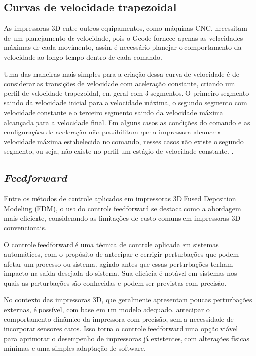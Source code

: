 \subsection{Curvas de velocidade trapezoidal}
As impressoras 3D entre outros equipamentos, como máquinas CNC, necessitam
de um planejamento de velocidade, pois o Gcode fornece apenas as velocidades máximas
de cada movimento, assim é necessário planejar o comportamento da velocidade ao longo tempo
dentro de cada comando.

Uma das maneiras mais simples para a criação dessa curva de velocidade é
de considerar as transições de velocidade com aceleração constante, criando 
um perfil de velocidade trapezoidal, em geral com 3 segmentos.
O primeiro segmento saindo da velocidade inicial para a velocidade máxima,
o segundo segmento com velocidade constante e o terceiro segmento saindo da velocidade máxima alcançada
para a velocidade final.
Em alguns casos as condições do comando e as configurações de aceleração não possibilitam que a impressora
alcance a velocidade máxima estabelecida no comando, nesses casos não existe o segundo segmento, ou seja, não existe
no perfil um estágio de velocidade constante.
\cite{yu20,klipperkinematic}.

\subsection{\textit{Feedforward}}
Entre os métodos de controle aplicados em impressoras 3D Fused Deposition Modeling (FDM), o uso do controle feedforward se destaca como a abordagem mais eficiente, considerando as limitações de custo comuns em impressoras 3D convencionais.

O controle feedforward é uma técnica de controle aplicada em sistemas automáticos, com o propósito de antecipar e corrigir perturbações que podem afetar um processo ou sistema, agindo antes que essas perturbações tenham impacto na saída desejada do sistema. Sua eficácia é notável em sistemas nos quais as perturbações são conhecidas e podem ser previstas com precisão.

No contexto das impressoras 3D, que geralmente apresentam poucas perturbações externas, é possível, com base em um modelo adequado, antecipar o comportamento dinâmico da impressora com precisão, sem a necessidade de incorporar sensores caros. Isso torna o controle feedforward uma opção viável para aprimorar o desempenho de impressoras já existentes, com alterações físicas mínimas e uma simples adaptação de software.


